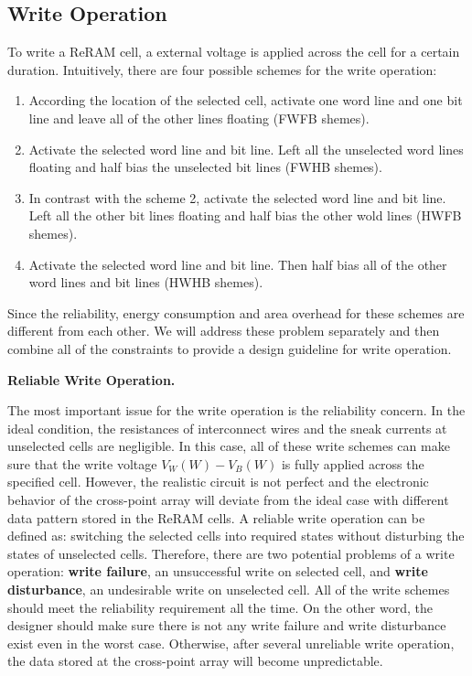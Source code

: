 \subsection{Write Operation}
To write a ReRAM cell, a external voltage is applied across the cell for a certain duration. Intuitively, there are four possible schemes for the write operation:
\begin{enumerate}
  \item According the location of the selected cell, activate one word line and one bit line and leave all of the other lines floating (FWFB shemes).
  \item Activate the selected word line and bit line. Left all the unselected word lines floating and half bias the unselected bit lines (FWHB shemes).
  \item In contrast with the scheme 2, activate the selected word line and bit line. Left all the other bit lines floating and half bias the other wold lines (HWFB shemes).
  \item Activate the selected word line and bit line. Then half bias all of the other word lines and bit lines (HWHB shemes).
\end{enumerate}
Since the reliability, energy consumption and area overhead for these
schemes are different from each other. We will address these problem
separately and then combine all of the constraints to provide a design
guideline for write operation.

\vspace{10pt} \textbf{Reliable Write Operation.} \vspace{8pt}

The most important issue for the write operation is the reliability
concern. In the ideal condition, the resistances of interconnect wires and the sneak currents at unselected cells are negligible. In this case, all of these write schemes can make sure that the write voltage $V_W(W)-V_B(W)$ is fully applied across the specified cell. However, the realistic circuit is not perfect and the electronic behavior of the cross-point array will deviate from the ideal case with different
data pattern stored in the ReRAM cells. A reliable write operation can be defined as: switching the selected cells into required states without disturbing the states of unselected cells. Therefore, there are two potential problems of a write operation: \textbf{write failure}, an unsuccessful write on selected cell, and \textbf{write disturbance}, an undesirable write on unselected cell. All of the write schemes should meet the reliability requirement all the time. On the other word, the designer should make sure there is not any write failure and write disturbance exist even in the worst case. Otherwise, after several unreliable write operation, the data stored at the cross-point array will become unpredictable.

